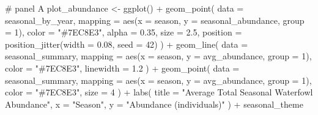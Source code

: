 \documentclass[
  letterpaper,
  DIV=11,
  numbers=noendperiod]{scrartcl}
\newenvironment{Shaded}{\begin{snugshade}}{\end{snugshade}}
\newcommand{\AttributeTok}[1]{\textcolor[rgb]{0.40,0.45,0.13}{#1}}
\newcommand{\CommentTok}[1]{\textcolor[rgb]{0.37,0.37,0.37}{#1}}
\newcommand{\DecValTok}[1]{\textcolor[rgb]{0.68,0.00,0.00}{#1}}
\newcommand{\FloatTok}[1]{\textcolor[rgb]{0.68,0.00,0.00}{#1}}
\newcommand{\FunctionTok}[1]{\textcolor[rgb]{0.28,0.35,0.67}{#1}}
\newcommand{\NormalTok}[1]{\textcolor[rgb]{0.00,0.23,0.31}{#1}}
\newcommand{\OtherTok}[1]{\textcolor[rgb]{0.00,0.23,0.31}{#1}}
\newcommand{\SpecialCharTok}[1]{\textcolor[rgb]{0.37,0.37,0.37}{#1}}
\newcommand{\StringTok}[1]{\textcolor[rgb]{0.13,0.47,0.30}{#1}}
\begin{document}
\begin{Shaded}
\begin{Highlighting}[]
\CommentTok{\# panel A}
\NormalTok{plot\_abundance }\OtherTok{\textless{}{-}} \FunctionTok{ggplot}\NormalTok{() }\SpecialCharTok{+}
  \FunctionTok{geom\_point}\NormalTok{(}
    \AttributeTok{data     =}\NormalTok{ seasonal\_by\_year,}
    \AttributeTok{mapping  =} \FunctionTok{aes}\NormalTok{(}\AttributeTok{x =}\NormalTok{ season, }\AttributeTok{y =}\NormalTok{ seasonal\_abundance, }\AttributeTok{group =} \DecValTok{1}\NormalTok{),}
    \AttributeTok{color    =} \StringTok{"\#7EC8E3"}\NormalTok{, }\AttributeTok{alpha =} \FloatTok{0.35}\NormalTok{, }\AttributeTok{size =} \FloatTok{2.5}\NormalTok{,}
    \AttributeTok{position =} \FunctionTok{position\_jitter}\NormalTok{(}\AttributeTok{width =} \FloatTok{0.08}\NormalTok{, }\AttributeTok{seed =} \DecValTok{42}\NormalTok{)}
\NormalTok{  ) }\SpecialCharTok{+}
  \FunctionTok{geom\_line}\NormalTok{(}
    \AttributeTok{data    =}\NormalTok{ seasonal\_summary,}
    \AttributeTok{mapping =} \FunctionTok{aes}\NormalTok{(}\AttributeTok{x =}\NormalTok{ season, }\AttributeTok{y =}\NormalTok{ avg\_abundance, }\AttributeTok{group =} \DecValTok{1}\NormalTok{),}
    \AttributeTok{color =} \StringTok{"\#7EC8E3"}\NormalTok{, }\AttributeTok{linewidth =} \FloatTok{1.2}
\NormalTok{  ) }\SpecialCharTok{+}
  \FunctionTok{geom\_point}\NormalTok{(}
    \AttributeTok{data    =}\NormalTok{ seasonal\_summary,}
    \AttributeTok{mapping =} \FunctionTok{aes}\NormalTok{(}\AttributeTok{x =}\NormalTok{ season, }\AttributeTok{y =}\NormalTok{ avg\_abundance, }\AttributeTok{group =} \DecValTok{1}\NormalTok{),}
    \AttributeTok{color =} \StringTok{"\#7EC8E3"}\NormalTok{, }\AttributeTok{size =} \DecValTok{4}
\NormalTok{  ) }\SpecialCharTok{+}
  \FunctionTok{labs}\NormalTok{(}
    \AttributeTok{title =} \StringTok{"Average Total Seasonal Waterfowl Abundance"}\NormalTok{,}
    \AttributeTok{x     =} \StringTok{"Season"}\NormalTok{,}
    \AttributeTok{y     =} \StringTok{"Abundance (individuals)"}
\NormalTok{  ) }\SpecialCharTok{+}
\NormalTok{  seasonal\_theme}


\end{Highlighting}
\end{Shaded}
\end{document}
